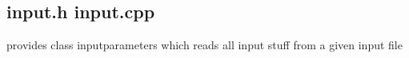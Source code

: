 
\subsection{input.h input.cpp}
provides class inputparameters which reads all input stuff from a given input file